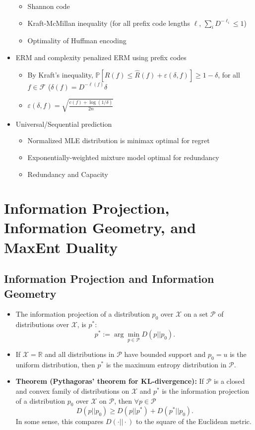 \documentclass{article}
\newcommand{\R}{\mathbb{R}}                         %
\newcommand{\e}{\varepsilon}                        %
\newcommand{\X}{\mathcal{X}}                        %
\newcommand{\pr}{\mathbb{P}}                        %
\newcommand{\Pds}{\mathcal{P}}
\begin{document}
\begin{itemize}
\begin{itemize}
\item Shannon code
\item Kraft-McMillan inequality (for all prefix code lengths $\ell$,
$\sum_i D^{-\ell_i} \leq 1$)
\item Optimality of Huffman encoding
\end{itemize}
\item ERM and complexity penalized ERM using prefix codes
\begin{itemize}
\item By Kraft's inequality,
$\pr\left[ R(f) \leq \hat R(f) + \e(\delta,f) \right] \geq 1 - \delta$, for all
$f \in \mathcal{F}$ ($\delta(f) = D^{-\ell(f)} \delta$
\item $\e(\delta,f) = \sqrt{\frac{c(f) + \log(1/\delta)}{2n}}$
\end{itemize}
\item
Universal/Sequential prediction
\begin{itemize}
\item Normalized MLE distribution is minimax optimal for regret
\item Exponentially-weighted mixture model optimal for redundancy
\item Redundancy and Capacity
\end{itemize}
\end{itemize}

\section{Information Projection, Information Geometry, and MaxEnt Duality}
\subsection{Information Projection and Information Geometry}
\begin{itemize}
\item The information projection of a distribution $p_0$ over $\X$ on a set
$\Pds$ of distributions over $\X$, is $p^*$:
\[p^* := \arg\min_{p \in \Pds} D(p || p_0).\]
\item If $\X = \R$ and all distributions in $\Pds$ have bounded support and
$p_0 = u$ is the uniform distribution, then $p^*$ is the maximum entropy
distribution in $\Pds$.
\item {\bf Theorem (Pythagoras' theorem for KL-divergence):} If $\Pds$ is a
closed and convex family of distributions on $\X$ and $p^*$ is the information
projection of a distribution $p_0$ over $\X$ on $\Pds$, then
$\forall p \in \Pds$
\[D(p || p_0) \geq D(p || p^*) + D(p^* || p_0).\]
In some sense, this compares $D(\cdot || \cdot)$ to the square of the Euclidean
metric.
\end{itemize}
\end{document}
